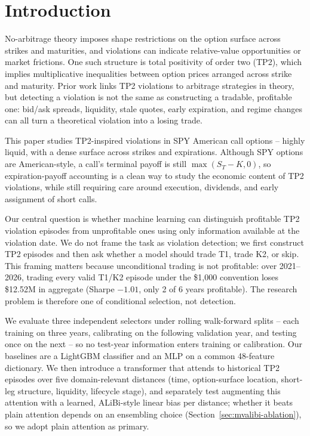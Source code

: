 \documentclass[sigconf,review,anonymous]{acmart}
\begin{document}


\maketitle

\section{Introduction}
\label{sec:intro}

No-arbitrage theory imposes shape restrictions on the option surface across strikes and maturities, and violations can indicate relative-value opportunities or market frictions. One such structure is total positivity of order two (TP2), which implies multiplicative inequalities between option prices arranged across strike and maturity. Prior work links TP2 violations to arbitrage strategies in theory, but detecting a violation is not the same as constructing a tradable, profitable one: bid/ask spreads, liquidity, stale quotes, early expiration, and regime changes can all turn a theoretical violation into a losing trade.

This paper studies TP2-inspired violations in SPY American call options -- highly liquid, with a dense surface across strikes and expirations. Although SPY options are American-style, a call's terminal payoff is still $\max(S_T-K,0)$, so expiration-payoff accounting is a clean way to study the economic content of TP2 violations, while still requiring care around execution, dividends, and early assignment of short calls.

Our central question is whether machine learning can distinguish profitable TP2 violation episodes from unprofitable ones using only information available at the violation date. We do not frame the task as violation detection; we first construct TP2 episodes and then ask whether a model should trade T1, trade K2, or skip. This framing matters because unconditional trading is not profitable: over 2021--2026, trading every valid T1/K2 episode under the \$1,000 convention loses \$12.52M in aggregate (Sharpe $-1.01$, only 2 of 6 years profitable). The research problem is therefore one of conditional selection, not detection.

We evaluate three independent selectors under rolling walk-forward splits -- each training on three years, calibrating on the following validation year, and testing once on the next -- so no test-year information enters training or calibration. Our baselines are a LightGBM classifier and an MLP on a common 48-feature dictionary. We then introduce a transformer that attends to historical TP2 episodes over five domain-relevant distances (time, option-surface location, short-leg structure, liquidity, lifecycle stage), and separately test augmenting this attention with a learned, ALiBi-style linear bias per distance; whether it beats plain attention depends on an ensembling choice (Section~\ref{sec:mvalibi-ablation}), so we adopt plain attention as primary.
\end{document}
